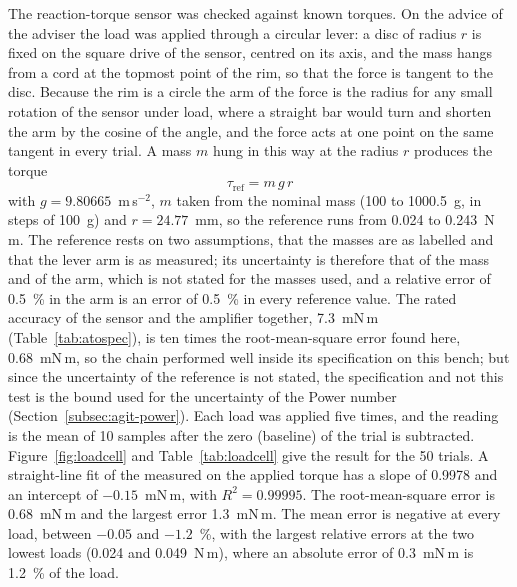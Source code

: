 The reaction-torque sensor was checked against known torques. On the advice of the adviser the load was applied through a circular lever: a disc of radius $r$ is fixed on the square drive of the sensor, centred on its axis, and the mass hangs from a cord at the topmost point of the rim, so that the force is tangent to the disc. Because the rim is a circle the arm of the force is the radius for any small rotation of the sensor under load, where a straight bar would turn and shorten the arm by the cosine of the angle, and the force acts at one point on the same tangent in every trial. A mass $m$ hung in this way at the radius $r$ produces the torque
\begin{equation}
    \tau_{\mathrm{ref}} = m\, g\, r
    \label{eq:tau-ref}
\end{equation}
with $g = 9.80665$~m\,s$^{-2}$, $m$ taken from the nominal mass (100 to 1000.5~g, in steps of 100~g) and $r = 24.77$~mm, so the reference runs from 0.024 to 0.243~N\,m. The reference rests on two assumptions, that the masses are as labelled and that the lever arm is as measured; its uncertainty is therefore that of the mass and of the arm, which is not stated for the masses used, and a relative error of 0.5~\% in the arm is an error of 0.5~\% in every reference value. The rated accuracy of the sensor and the amplifier together, 7.3~mN\,m (Table~\ref{tab:atospec}), is ten times the root-mean-square error found here, 0.68~mN\,m, so the chain performed well inside its specification on this bench; but since the uncertainty of the reference is not stated, the specification and not this test is the bound used for the uncertainty of the Power number (Section~\ref{subsec:agit-power}).
Each load was applied five times, and the reading is the mean of 10 samples after the zero (baseline) of the trial is subtracted. Figure~\ref{fig:loadcell} and Table~\ref{tab:loadcell} give the result for the 50 trials. A straight-line fit of the measured on the applied torque has a slope of 0.9978 and an intercept of $-0.15$~mN\,m, with $R^{2} = 0.99995$. The root-mean-square error is 0.68~mN\,m and the largest error 1.3~mN\,m. The mean error is negative at every load, between $-0.05$ and $-1.2$~\%, with the largest relative errors at the two lowest loads (0.024 and 0.049~N\,m), where an absolute error of 0.3~mN\,m is 1.2~\% of the load.

